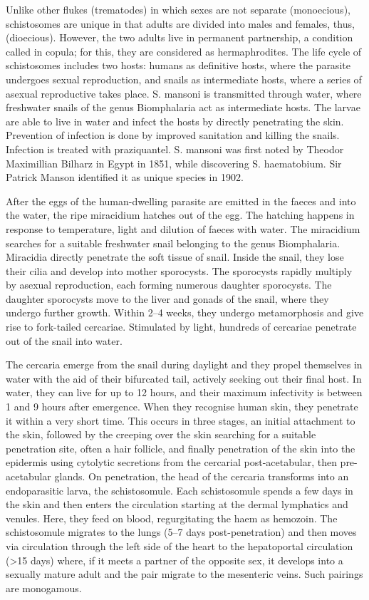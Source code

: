 \documentclass[]{book}
\begin{document}
Unlike other flukes (trematodes) in which sexes are not separate (monoecious), schistosomes are unique in that adults are divided into males and females, thus, (dioecious). However, the two adults live in permanent partnership, a condition called in copula; for this, they are considered as hermaphrodites. The life cycle of schistosomes includes two hosts: humans as definitive hosts, where the parasite undergoes sexual reproduction, and snails as intermediate hosts, where a series of asexual reproductive takes place. S. mansoni is transmitted through water, where freshwater snails of the genus Biomphalaria act as intermediate hosts. The larvae are able to live in water and infect the hosts by directly penetrating the skin. Prevention of infection is done by improved sanitation and killing the snails. Infection is treated with praziquantel. S. mansoni was first noted by Theodor Maximillian Bilharz in Egypt in 1851, while discovering S. haematobium. Sir Patrick Manson identified it as unique species in 1902.

After the eggs of the human-dwelling parasite are emitted in the faeces and into the water, the ripe miracidium hatches out of the egg. The hatching happens in response to temperature, light and dilution of faeces with water. The miracidium searches for a suitable freshwater snail belonging to the genus Biomphalaria. Miracidia directly penetrate the soft tissue of snail. Inside the snail, they lose their cilia and develop into mother sporocysts. The sporocysts rapidly multiply by asexual reproduction, each forming numerous daughter sporocysts. The daughter sporocysts move to the liver and gonads of the snail, where they undergo further growth. Within 2--4 weeks, they undergo metamorphosis and give rise to fork-tailed cercariae. Stimulated by light, hundreds of cercariae penetrate out of the snail into water.

The cercaria emerge from the snail during daylight and they propel themselves in water with the aid of their bifurcated tail, actively seeking out their final host. In water, they can live for up to 12 hours, and their maximum infectivity is between 1 and 9 hours after emergence. When they recognise human skin, they penetrate it within a very short time. This occurs in three stages, an initial attachment to the skin, followed by the creeping over the skin searching for a suitable penetration site, often a hair follicle, and finally penetration of the skin into the epidermis using cytolytic secretions from the cercarial post-acetabular, then pre-acetabular glands. On penetration, the head of the cercaria transforms into an endoparasitic larva, the schistosomule. Each schistosomule spends a few days in the skin and then enters the circulation starting at the dermal lymphatics and venules. Here, they feed on blood, regurgitating the haem as hemozoin. The schistosomule migrates to the lungs (5--7 days post-penetration) and then moves via circulation through the left side of the heart to the hepatoportal circulation (\textgreater{}15 days) where, if it meets a partner of the opposite sex, it develops into a sexually mature adult and the pair migrate to the mesenteric veins. Such pairings are monogamous.
\end{document}
